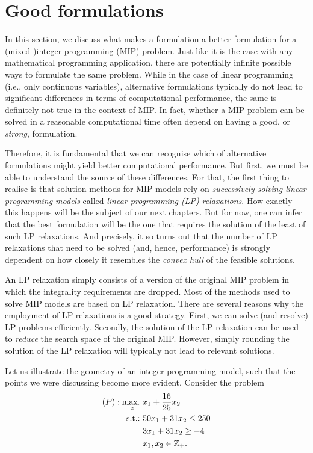  
\section{Good formulations}

In this section, we discuss what makes a formulation a better formulation for a (mixed-)integer programming (MIP) problem. Just like it is the case with any mathematical programming application, there are potentially infinite possible ways to formulate the same problem. While in the case of linear programming (i.e., only continuous variables), alternative formulations typically do not lead to significant differences in terms of computational performance, the same is definitely not true in the context of MIP. In fact, whether a MIP problem can be solved in a reasonable computational time often depend on having a good, or \emph{strong}, formulation.

Therefore, it is fundamental that we can recognise which of alternative formulations might yield better computational performance. But first, we must be able to understand the source of these differences. For that, the first thing to realise is that solution methods for MIP models rely on \emph{successively solving linear programming models} called \emph{linear programming (LP) relaxations}. How exactly this happens will be the subject of our next chapters. But for now, one can infer that the best formulation will be the one that requires the solution of the least of such LP relaxations. And precisely, it so turns out that the number of LP relaxations that need to be solved (and, hence, performance) is strongly dependent on how closely it resembles the \emph{convex hull} of the feasible solutions.

An LP relaxation simply consists of a version of the original MIP problem in which the integrality requirements are dropped. Most of the methods used to solve MIP models are based on LP relaxation. There are several reasons why the employment of LP relaxations is a good strategy. First, we can solve (and resolve) LP problems efficiently. Secondly, the solution of the LP relaxation can be used to \emph{reduce} the search space of the original MIP. However, simply rounding the solution of the LP relaxation will typically not lead to relevant solutions.

Let us illustrate the geometry of an integer programming model, such that the points we were discussing become more evident. Consider the problem
%
\begin{align*}
	(P): \mathop{\text{max.~}}_x &x_1 + \frac{16}{25}x_2 \\
	\mathop{\text{s.t.:~}} &50x_1 + 31x_2 \leq 250\\
	&3x_1 + 31x_2 \geq -4\\
	&x_1, x_2 \in \mathbb{Z}_+.
\end{align*}
 
